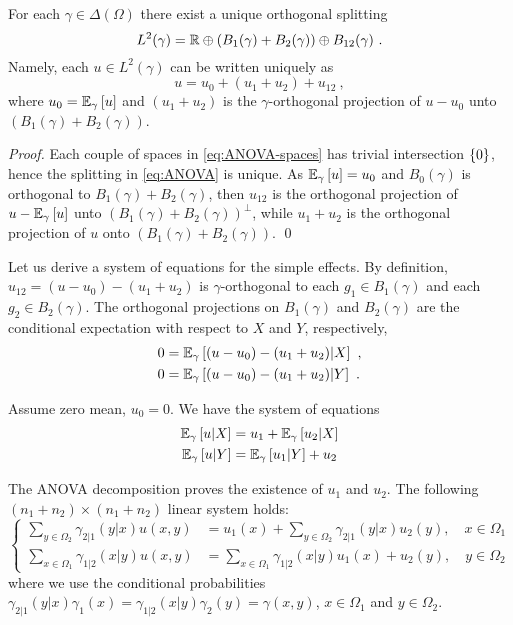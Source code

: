 \documentclass[runningheads]{llncs}
\begin{document}
\begin{proposition}For each $\gamma \in \Delta(\Omega)$ there exist a unique orthogonal splitting
%
\begin{equation*}
%
  L^2(\gamma) = \reals \oplus \left(B_1(\gamma) + B_2(\gamma)\right) \oplus B_{12}(\gamma) \ . 
\end{equation*}
Namely, each $u \in L^2(\gamma)$ can be written uniquely as
\begin{equation}
 \label{eq:ANOVA}
 u = u_0 + (u_1 + u_2) + u_{12} \ ,
\end{equation}
where $u_0={\operatorname{\mathbb E}}_{\gamma}\left[u\right]$ and $(u_1+u_2)$ is the $\gamma$-orthogonal projection of $u-u_0$ unto
$(B_1(\gamma) + B_2(\gamma))$.
\end{proposition}

\begin{proof}Each couple of spaces in \cref{eq:ANOVA-spaces} has trivial intersection $\left\{ 0 \right\}$, hence the splitting in \cref{eq:ANOVA} is unique. As ${\operatorname{\mathbb E}}_{\gamma}\left[u\right] = u_0$ and $B_0(\gamma)$ is orthogonal to $B_1(\gamma)+B_2(\gamma)$, then $u_{12}$ is the orthogonal projection of $u - {\operatorname{\mathbb E}}_{\gamma}\left[u\right]$ unto $(B_1(\gamma)+B_2(\gamma))^\perp$, while $u_1+u_2$ is the orthogonal projection of $u$ onto $(B_1(\gamma)+B_2(\gamma))$. \qed
\end{proof}

Let us derive a system of equations for the simple effects. By definition, $u_{12} = (u - u_0) - (u_1 + u_2)$ is $\gamma$-orthogonal to each $g_1 \in B_1(\gamma)$ and each $g_2 \in B_2(\gamma)$. The orthogonal projections on $B_1(\gamma)$ and $B_2(\gamma)$ are the conditional expectation with respect to $X$ and $Y$, respectively,
%
  \begin{align*}
    0 &= {\operatorname{\mathbb E}}_{\gamma}\left[(u-u_0) - (u_1+u_2) \middle| X\right]  \ , \\
   0 &= {\operatorname{\mathbb E}}_{\gamma}\left[(u-u_0) - (u_1+u_2) \middle| Y\right] \ .
  \end{align*}

Assume zero mean, $u_0=0$. We have the system of equations
\begin{align*}
  {\operatorname{\mathbb E}}_{\gamma}\left[u \middle| X\right] &=  u_1 + {\operatorname{\mathbb E}}_{\gamma}\left[u_2 \middle| X\right] \\
  {\operatorname{\mathbb E}}_{\gamma}\left[u \middle| Y\right] &= {\operatorname{\mathbb E}}_{\gamma}\left[u_1 \middle| Y\right] + u_2
\end{align*}

The ANOVA decomposition proves the existence of $u_1$ and $u_2$.  The following $(n_1+n_2)\times(n_1+n_2)$ linear system holds:
\begin{equation*}
\begin{cases}
  \sum_{y \in \Omega_2} \gamma_{2|1}(y|x)u(x,y) &= u_1(x) + \sum_{y \in \Omega_2} \gamma_{2|1}(y|x) u_2(y) , \quad x \in \Omega_1 \\
  \sum_{x \in \Omega_1} \gamma_{1|2}(x|y)u(x,y) &= \sum_{x \in \Omega_1} \gamma_{1|2}(x|y) u_1(x)  + u_2(y) , \quad y \in \Omega_2
\end{cases}
\end{equation*}
where we use the conditional probabilities $\gamma_{2|1}(y|x) \gamma_1(x) = \gamma_{1|2}(x|y) \gamma_2(y) = \gamma(x,y)$, $x \in \Omega_1$ and $y \in \Omega_2$.
\end{document}
